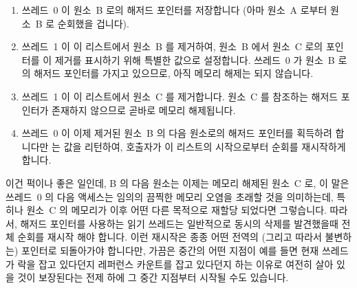 \fi

\begin{enumerate}
\item	쓰레드~0 이 원소~B 로의 해저드 포인터를 저장합니다
	(아마 원소~A 로부터 원소~B 로 순회했을 겁니다).
\item	쓰레드~1 이 이 리스트에서 원소~B 를 제거하여, 원소~B 에서 원소~C 로의
	포인터를 이 제거를 표시하기 위해 특별한  값으로
	설정합니다.
	쓰레드~0 가 원소~B 로의 해저드 포인터를 가지고 있으므로, 아직 메모리
	해제는 되지 않습니다.
\item	쓰레드~1 이 이 리스트에서 원소~C 를 제거합니다.
	원소~C 를 참조하는 해저드 포인터가 존재하지 않으므로 곧바로 메모리
	해제됩니다.
\item	쓰레드~0 이 이제 제거된 원소~B 의 다음 원소로의 해저드 포인터를
	획득하려 합니다만  는  값을
	리턴하여, 호출자가 이 리스트의 시작으로부터 순회를 재시작하게 합니다.

\end{enumerate}

이건 퍽이나 좋은 일인데, B 의 다음 원소는 이제는 메모리 해제된 원소~C 로, 이
말은 쓰레드~0 의 다음 액세스는 임의의 끔찍한 메모리 오염을 초래할 것을
의미하는데, 특히나 원소~C 의 메모리가 이후 어떤 다른 목적으로 재할당 되었다면
그렇습니다.
따라서, 해저드 포인터를 사용하는 읽기 쓰레드는 일반적으로 동시의 삭제를
발견했을때 전체 순회를 재시작 해야 합니다.
이런 재시작은 종종 어떤 전역의 (그리고 따라서 불변하는) 포인터로 되돌아가야
합니다만, 가끔은 중간의 어떤 지점이 예를 들면 현재 쓰레드가 락을 잡고 있다던지
레퍼런스 카운트를 잡고 있다던지 하는 이유로 여전히 살아 있을 것이 보장된다는
전제 하에 그 중간 지점부터 시작될 수도 있습니다.

